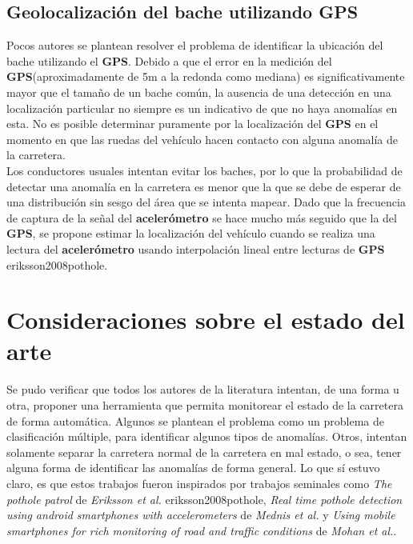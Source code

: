 	\subsection{Geolocalización del bache utilizando GPS}
		Pocos autores se plantean resolver el problema de identificar la ubicación del bache utilizando el \textbf{GPS}. Debido a que el
		error en la medición del \textbf{GPS}(aproximadamente de 5m a la redonda como mediana) es significativamente mayor que el tamaño de un bache
		común, la ausencia de una detección en una localización particular no siempre es un indicativo de que no haya anomalías en esta. No es
		posible determinar puramente por la localización del \textbf{GPS} en el momento en que las ruedas del vehículo hacen contacto con alguna
		anomalía de la carretera.\\
		\indent Los conductores usuales intentan evitar los baches, por lo que la probabilidad de detectar una anomalía en la carretera es menor que la
		que se debe de esperar de una distribución sin sesgo del área que se intenta mapear. Dado que la frecuencia
		de captura de la señal del \textbf{acelerómetro} se hace mucho más seguido que la del \textbf{GPS}, se propone estimar la localización del
		vehículo cuando se realiza una lectura del \textbf{acelerómetro} usando interpolación lineal entre lecturas de \textbf{GPS}\brackcite
		{eriksson2008pothole}.

\section{Consideraciones sobre el estado del arte}
	Se pudo verificar que todos los autores de la literatura intentan, de una forma u otra, proponer una herramienta que permita monitorear el estado de
	la carretera de forma automática. Algunos se plantean el problema como un problema de clasificación múltiple, para identificar algunos tipos de anomalías.
	Otros, intentan solamente separar la carretera normal de la carretera en mal estado, o sea, tener alguna forma de identificar las anomalías de forma general.
	Lo que sí estuvo claro, es que estos trabajos fueron inspirados por trabajos seminales como \emph{The pothole patrol} de \emph{Eriksson et al.}\brackcite
	{eriksson2008pothole}, \emph{Real time pothole detection using android smartphones with accelerometers} de \emph{Mednis et al.} y 
	\emph{Using mobile smartphones for rich monitoring of road and traffic conditions} de \emph{Mohan et al.}. 

